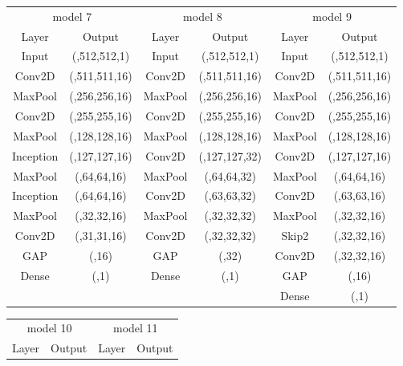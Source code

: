 \documentclass[
a4paper, 
12pt,
grayscalebody, %
abstract=on,
twoside, BCOR10mm, 12pt, DIV13,headinclude, footexclude, final, abstracton, openright
]{ibireprt}
\numberwithin{equation}{chapter}
\numberwithin{table}{chapter}
\numberwithin{figure}{chapter}
\numberwithin{algorithm}{chapter}
\numberwithin{example}{chapter}
\numberwithin{example}{chapter}
\begin{document}
\begin{table}
\begin{tabular}{cccccc}
	\toprule
	\multicolumn{2}{c}{model 7} &\multicolumn{2}{c}{model 8} & \multicolumn{2}{c}{model 9} \\ 
	Layer & Output &Layer & Output &Layer & Output\\
	\cmidrule(l){1-2} \cmidrule(l){3-4}\cmidrule(l){5-6}
	Input&(,512,512,1)&Input&(,512,512,1)&Input&(,512,512,1)\\
	\cmidrule(l){1-2} \cmidrule(l){3-4}\cmidrule(l){5-6}
	Conv2D& (,511,511,16) &Conv2D	& (,511,511,16)&Conv2D	& (,511,511,16)\\
	\cmidrule(l){1-2} \cmidrule(l){3-4}\cmidrule(l){5-6}
	MaxPool&(,256,256,16)&MaxPool&(,256,256,16)&MaxPool&(,256,256,16)\\
	\cmidrule(l){1-2} \cmidrule(l){3-4}\cmidrule(l){5-6}
	Conv2D&(,255,255,16)&Conv2D&(,255,255,16)&Conv2D&(,255,255,16)\\
	\cmidrule(l){1-2} \cmidrule(l){3-4}\cmidrule(l){5-6}
	MaxPool&(,128,128,16)&MaxPool&(,128,128,16)&MaxPool&(,128,128,16)\\
	\cmidrule(l){1-2} \cmidrule(l){3-4}\cmidrule(l){5-6}
	Inception&(,127,127,16)&Conv2D&(,127,127,32)&Conv2D&(,127,127,16)\\
	\cmidrule(l){1-2} \cmidrule(l){3-4}\cmidrule(l){5-6}
	MaxPool&(,64,64,16)&MaxPool&(,64,64,32)&MaxPool&(,64,64,16)\\
	\cmidrule(l){1-2} \cmidrule(l){3-4}\cmidrule(l){5-6}
	Inception&(,64,64,16)&Conv2D&(,63,63,32)&Conv2D&(,63,63,16)\\
	\cmidrule(l){1-2} \cmidrule(l){3-4}\cmidrule(l){5-6}
	MaxPool&(,32,32,16)&MaxPool&(,32,32,32)&MaxPool&(,32,32,16)\\
	\cmidrule(l){1-2} \cmidrule(l){3-4}\cmidrule(l){5-6}
	Conv2D&(,31,31,16)&Conv2D&(,32,32,32)&Skip2&(,32,32,16)\\
	\cmidrule(l){1-2} \cmidrule(l){3-4}\cmidrule(l){5-6}
	GAP&(,16)&GAP&(,32)&Conv2D&(,32,32,16)\\
	\cmidrule(l){1-2} \cmidrule(l){3-4}\cmidrule(l){5-6}
	Dense&(,1)&Dense&(,1)&GAP&(,16)\\
	\cmidrule(l){5-6}
	&&&&Dense&(,1)\\
\end{tabular}
%
	\begin{tabular}{cccc}
		\toprule
		\multicolumn{2}{c}{model 10} &\multicolumn{2}{c}{model 11}  \\ 
		Layer & Output &Layer & Output \\

\end{tabular}
\end{table}
\end{document}
